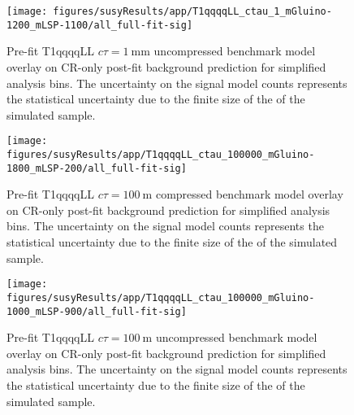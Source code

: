 \begin{figure}[h!]
    \begin{center}
        \texttt{[image: figures/susyResults/app/T1qqqqLL\_ctau\_1\_mGluino-1200\_mLSP-1100/all\_full-fit-sig]}
        \caption{
            Pre-fit T1qqqqLL $c\tau=1~\mathrm{mm}$ uncompressed benchmark
            model overlay on CR-only post-fit background prediction for
            simplified analysis bins. The uncertainty on the signal model counts
            represents the statistical uncertainty due to the finite size of the
            of the simulated sample.
        }
        \label{fig:T1qqqqLL_ctau_1_uncompressed_MR_simp}
    \end{center}
\end{figure}

\begin{figure}[h!]
    \begin{center}
        \texttt{[image: figures/susyResults/app/T1qqqqLL\_ctau\_100000\_mGluino-1800\_mLSP-200/all\_full-fit-sig]}
        \caption{
            Pre-fit T1qqqqLL $c\tau=100~\mathrm{m}$ compressed benchmark
            model overlay on CR-only post-fit background prediction for
            simplified analysis bins. The uncertainty on the signal model counts
            represents the statistical uncertainty due to the finite size of the
            of the simulated sample.
        }
        \label{fig:T1qqqqLL_ctau_100000_compressed_MR_simp}
    \end{center}
\end{figure}

\begin{figure}[h!]
    \begin{center}
        \texttt{[image: figures/susyResults/app/T1qqqqLL\_ctau\_100000\_mGluino-1000\_mLSP-900/all\_full-fit-sig]}
        \caption{
            Pre-fit T1qqqqLL $c\tau=100~\mathrm{m}$ uncompressed benchmark
            model overlay on CR-only post-fit background prediction for
            simplified analysis bins. The uncertainty on the signal model counts
            represents the statistical uncertainty due to the finite size of the
            of the simulated sample.
        }
        \label{fig:T1qqqqLL_ctau_100000_uncompressed_MR_simp}
    \end{center}
\end{figure}
